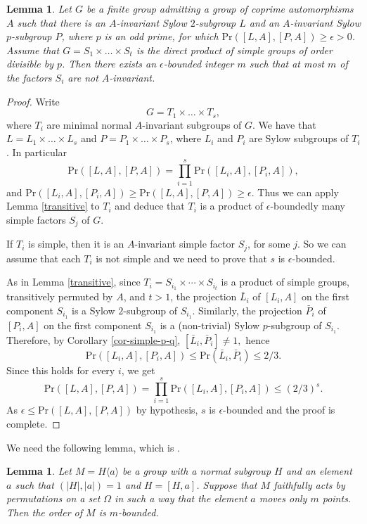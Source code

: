 \documentclass[12pt]{amsart}
\newtheorem{lemma}[theorem]{\bf Lemma}
\newcommand{\pr }{\mathrm{Pr} }
\newcommand{\ep}{\epsilon}
\begin{document}
 \begin{lemma}\label{non-transitive} 
 Let $G$ be a finite group admitting a group of coprime automorphisms $A$ such that there is an $A$-invariant Sylow $2$-subgroup $L$ and an $A$-invariant Sylow $p$-subgroup $P$, where $p$ is an odd prime, for which $\pr([L,A],[P,A])\ge\ep>0$. Assume that $G=S_1\times\dots\times S_t$ is the direct product of simple groups of order divisible by $p$. Then there exists an $\epsilon$-bounded integer $m$ such that at most $m$ of the factors $S_i$ are not $A$-invariant. 
\end{lemma} 
\begin{proof}
Write 
\[ G=T_1\times\dots\times T_s,\] 
where $T_i$ are minimal normal $A$-invariant subgroups of $G$. 
 We have that
  $L=L_1\times\dots\times L_s$ and  $P=P_1\times\dots\times P_s$, where 
 $L_i$ and $P_i$ are Sylow subgroups of  $T_i$.   
 In particular 
 \[ \pr([L,A],[P,A]) = \prod_{i=1}^s \pr([L_i,A],[P_i,A]), \]
  and $ \pr([L_i,A],[P_i,A]) \ge \pr([L,A],[P,A]) \ge \ep$. 
 Thus  we can apply Lemma \ref{transitive} to $T_i$  and deduce that $T_i$ is a product of $\ep$-boundedly many simple factors $S_j$ of $G$.   
 
If $T_i$ is simple, then it is an $A$-invariant simple factor $S_j$, for some $j$. So we can assume that each $T_i$ is not simple and we need to prove that $s$ is $\ep$-bounded. 

 As in Lemma \ref{transitive}, since $T_i = S_{i_1} \times \cdots \times S_{i_t}$ is a product of simple groups, transitively permuted by $A$, and $t>1$, 
  the projection $\bar L_i$ of $[L_i, A]$ on the first component $S_{i_1}$  is a Sylow $2$-subgroup of $S_{i_1}$. Similarly, 
    the projection $\bar P_i$ of $[P_i, A]$ on the first component $S_{i_1}$  is a (non-trivial) Sylow $p$-subgroup of $S_{i_1}$.  
  Therefore, by Corollary \ref{cor-simple-p-q},  $[\bar L_i, \bar P_i] \neq 1,$ hence 
  \[   \pr([L_i,A],[P_i,A])  \le  \pr (\bar L_i, \bar P_i) \le 2/3.\]  
Since this holds for every $i$, we get 
\[  \pr([L,A],[P,A]) = \prod_{i=1}^s  \pr([L_i,A],[P_i,A]) \le (2/3)^s.\] 
 As $ \ep \le  \pr([L,A],[P,A])$ by hypothesis,  $s$ is $\ep$-bounded and the proof is complete. 
\end{proof}

We need the following lemma, which is  \cite[Lemma 2.5]{AGS1}. 
\begin{lemma}\label{2.5}
Let $M = H\langle a \rangle$ be a group with a normal subgroup $H$ and an element 
$a$ such that $(|H|, |a|) = 1$ and $H = [H, a]$. Suppose that $M$ faithfully acts 
by permutations on a set $\Omega$ in such a way that the element $a$ moves only $m$ 
points. Then the order of $M$ is $m$-bounded.
\end{lemma}
\end{document}
